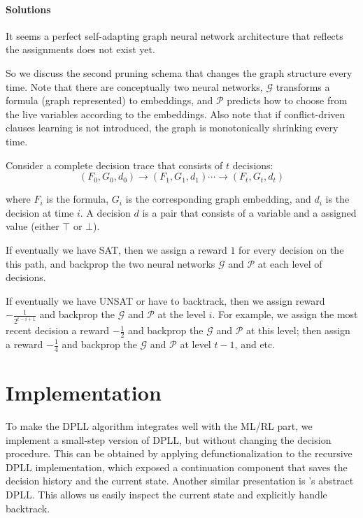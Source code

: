 \documentclass[sigplan,10pt]{acmart}\settopmatter{printfolios=true,printccs=false,printacmref=false}
\begin{document}
\paragraph{Solutions}

It seems a perfect self-adapting graph neural network architecture that reflects the assignments
does not exist yet. 

So we discuss the second pruning schema that changes the graph structure every time.
Note that there are conceptually two neural networks, $\mathcal{G}$ transforms a formula (graph represented) 
to embeddings, and $\mathcal{P}$ predicts how to choose from the live variables according to the embeddings.
Also note that if conflict-driven clauses learning is not introduced, 
the graph is monotonically shrinking every time.

Consider a complete decision trace that consists of $t$ decisions:
$$ (F_0, G_0, d_0) \to (F_1, G_1, d_1) \cdots \to (F_t, G_t, d_t) $$

where $F_i$ is the formula, $G_i$ is the corresponding graph embedding, and $d_i$ is the decision at time $i$.
A decision $d$ is a pair that consists of a variable and a assigned value (either $\top$ or $\bot$).

If eventually we have SAT, then we assign a reward $1$ for every decision on the this path,
and backprop the two neural networks $\mathcal{G}$ and $\mathcal{P}$ at each level of decisions.

If eventually we have UNSAT or have to backtrack, then we assign reward $-\frac{1}{2^{t-i+1}}$
and backprop the $\mathcal{G}$ and $\mathcal{P}$ at the level $i$.
For example, we assign the most recent decision a 
reward $-\frac{1}{2}$ and backprop the $\mathcal{G}$ and $\mathcal{P}$ at this level; then assign
a reward $-\frac{1}{4}$ and backprop the $\mathcal{G}$ and $\mathcal{P}$ at level $t-1$, and etc.

\section{Implementation}

To make the DPLL algorithm integrates well with the ML/RL part, we implement a small-step version of 
DPLL, but without changing the decision procedure. This can be obtained by applying 
defunctionalization \cite{DBLP:conf/ppdp/DanvyN01} to the recursive DPLL implementation, which exposed a continuation
component that saves the decision history and the current state. Another similar presentation
is \citeauthor{DBLP:conf/lpar/NieuwenhuisOT04}'s abstract DPLL.
This allows us easily inspect the current state and explicitly handle backtrack.
\end{document}
